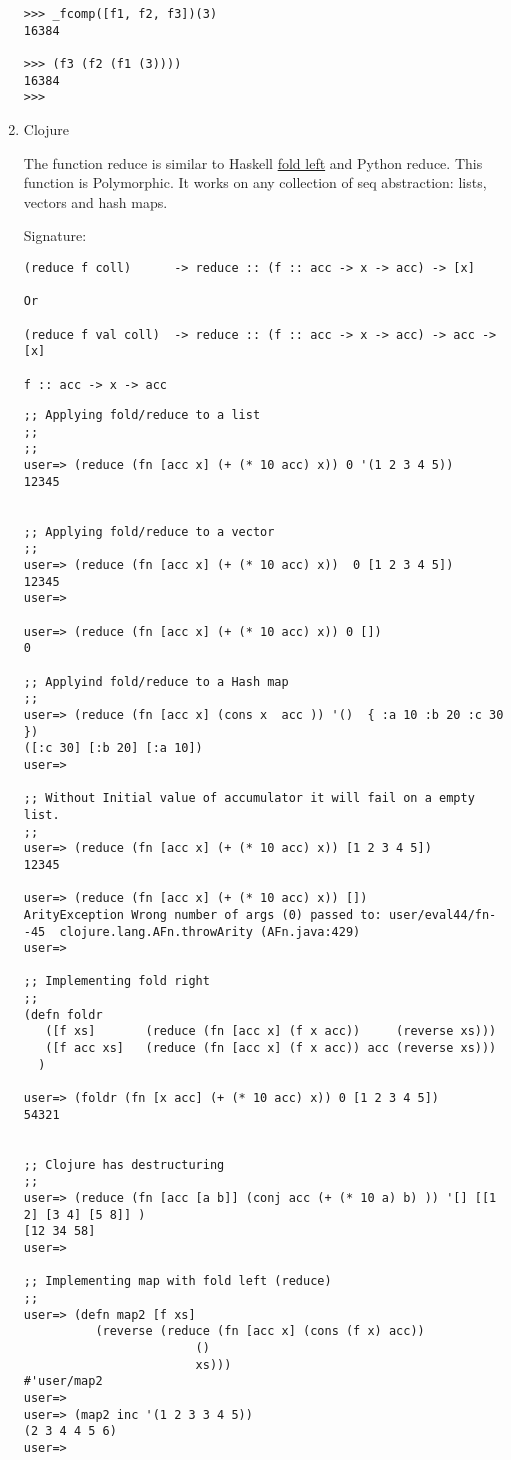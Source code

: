 \documentclass[11pt]{article}
\begin{document}
\begin{enumerate}
\begin{verbatim}
>>> _fcomp([f1, f2, f3])(3)
16384

>>> (f3 (f2 (f1 (3))))
16384
>>>
\end{verbatim}

\item Clojure
\label{sec-1-9-4-4}

The function reduce is similar to Haskell \uline{fold left} and Python
reduce. This function is Polymorphic. It works on any collection of
seq abstraction: lists, vectors and hash maps. 

Signature:

\begin{verbatim}
(reduce f coll)      -> reduce :: (f :: acc -> x -> acc) -> [x]

Or 

(reduce f val coll)  -> reduce :: (f :: acc -> x -> acc) -> acc -> [x] 

f :: acc -> x -> acc
\end{verbatim}


\begin{verbatim}
;; Applying fold/reduce to a list 
;;
;;
user=> (reduce (fn [acc x] (+ (* 10 acc) x)) 0 '(1 2 3 4 5))
12345


;; Applying fold/reduce to a vector 
;;
user=> (reduce (fn [acc x] (+ (* 10 acc) x))  0 [1 2 3 4 5])
12345
user=> 

user=> (reduce (fn [acc x] (+ (* 10 acc) x)) 0 [])
0

;; Applyind fold/reduce to a Hash map 
;;
user=> (reduce (fn [acc x] (cons x  acc )) '()  { :a 10 :b 20 :c 30 })
([:c 30] [:b 20] [:a 10])
user=>

;; Without Initial value of accumulator it will fail on a empty list. 
;; 
user=> (reduce (fn [acc x] (+ (* 10 acc) x)) [1 2 3 4 5])
12345

user=> (reduce (fn [acc x] (+ (* 10 acc) x)) [])
ArityException Wrong number of args (0) passed to: user/eval44/fn--45  clojure.lang.AFn.throwArity (AFn.java:429)
user=> 

;; Implementing fold right  
;;
(defn foldr 
   ([f xs]       (reduce (fn [acc x] (f x acc))     (reverse xs)))
   ([f acc xs]   (reduce (fn [acc x] (f x acc)) acc (reverse xs)))
  )

user=> (foldr (fn [x acc] (+ (* 10 acc) x)) 0 [1 2 3 4 5])
54321


;; Clojure has destructuring 
;;
user=> (reduce (fn [acc [a b]] (conj acc (+ (* 10 a) b) )) '[] [[1 2] [3 4] [5 8]] )
[12 34 58]
user=> 

;; Implementing map with fold left (reduce)
;;
user=> (defn map2 [f xs] 
          (reverse (reduce (fn [acc x] (cons (f x) acc)) 
                        () 
                        xs)))
#'user/map2
user=> 
user=> (map2 inc '(1 2 3 3 4 5))
(2 3 4 4 5 6)
user=> 


\end{verbatim}
\end{enumerate}
\end{document}
